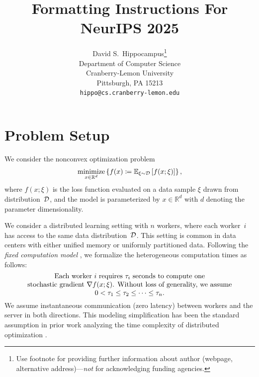 \documentclass{article}
\title{Formatting Instructions For NeurIPS 2025}
\author{%
  David S.~Hippocampus\thanks{Use footnote for providing further information
    about author (webpage, alternative address)---\emph{not} for acknowledging
    funding agencies.} \\
  Department of Computer Science\\
  Cranberry-Lemon University\\
  Pittsburgh, PA 15213 \\
  \texttt{hippo@cs.cranberry-lemon.edu} \\
}
\begin{document}
\maketitle





\section{Problem Setup}
% 
% 
We consider the nonconvex optimization problem
\begin{equation}\label{eq:problem}
  \mathop{\mathrm{minimize}}_{x \in \mathbb{R}^d} 
  \left\{ f(x) \coloneqq {\mathbb{E}}_{\xi \sim \mathcal{D}}\left[f(x;\xi)\right] \right\} ,
\end{equation}
where $f(x; \xi)$ is the loss function evaluated on a data sample $\xi$ drawn from distribution~$\mathcal{D}$, and the model is parameterized by $x \in \mathbb{R}^d$ with $d$ denoting the parameter dimensionality.

We consider a distributed learning setting with $n$ workers, where each worker~$i$ has access to the same data distribution~$\mathcal{D}$.
This setting is common in data centers with either unified memory or uniformly partitioned data.
Following the \textit{fixed computation model} \citep{mishchenko2022asynchronous}, we formalize the heterogeneous computation times as follows:
% 
\begin{equation}\label{eq:fixed_time}
  \begin{minipage}{0.9\linewidth}
    \centering
    Each worker~$i$ requires $\tau_i$~seconds to compute one stochastic~gradient~$\nabla f(x;\xi)$.

    Without loss of generality, we assume $0 < \tau_1 \le \tau_2 \le \cdots \le \tau_n$.
  \end{minipage}
\end{equation}
% 
We assume instantaneous communication (zero latency) between workers and the server in both directions.
This modeling simplification has been the standard assumption in prior work analyzing the time complexity of distributed optimization \citep{mishchenko2022asynchronous, koloskova2022sharper, tyurin2023optimal, maranjyan2025ringmaster}.
\end{document}
